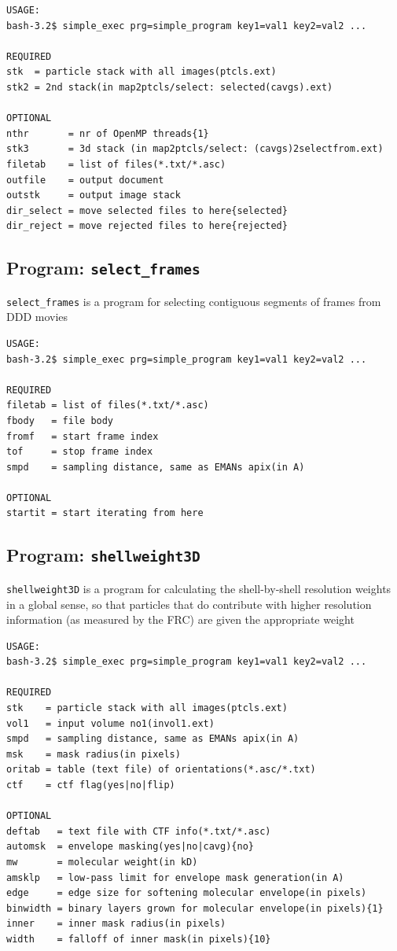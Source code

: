 \documentclass[a4paper,11pt]{article}
\newcommand{\prgname}[1]{\textcolor{NavyBlue}{\texttt{#1}}}
\begin{document}
\begin{verbatim}
USAGE:
bash-3.2$ simple_exec prg=simple_program key1=val1 key2=val2 ...

REQUIRED
stk  = particle stack with all images(ptcls.ext)
stk2 = 2nd stack(in map2ptcls/select: selected(cavgs).ext)

OPTIONAL
nthr       = nr of OpenMP threads{1}
stk3       = 3d stack (in map2ptcls/select: (cavgs)2selectfrom.ext)
filetab    = list of files(*.txt/*.asc)
outfile    = output document
outstk     = output image stack
dir_select = move selected files to here{selected}
dir_reject = move rejected files to here{rejected}
\end{verbatim}

\subsection{Program: \prgname{select\_frames}}
\label{select_frames}
\prgname{select\_frames} is a program for selecting contiguous segments of frames from DDD movies 

\begin{verbatim}
USAGE:
bash-3.2$ simple_exec prg=simple_program key1=val1 key2=val2 ...

REQUIRED
filetab = list of files(*.txt/*.asc)
fbody   = file body
fromf   = start frame index
tof     = stop frame index
smpd    = sampling distance, same as EMANs apix(in A)

OPTIONAL
startit = start iterating from here
\end{verbatim}

\subsection{Program: \prgname{shellweight3D}}
\label{shellweight3D}
\prgname{shellweight3D} is a program for calculating the shell-by-shell resolution weights in a global sense, so that particles that do contribute with higher resolution information (as measured by the FRC) are given the appropriate weight

\begin{verbatim}
USAGE:
bash-3.2$ simple_exec prg=simple_program key1=val1 key2=val2 ...

REQUIRED
stk    = particle stack with all images(ptcls.ext)
vol1   = input volume no1(invol1.ext)
smpd   = sampling distance, same as EMANs apix(in A)
msk    = mask radius(in pixels)
oritab = table (text file) of orientations(*.asc/*.txt)
ctf    = ctf flag(yes|no|flip)

OPTIONAL
deftab   = text file with CTF info(*.txt/*.asc)
automsk  = envelope masking(yes|no|cavg){no}
mw       = molecular weight(in kD)
amsklp   = low-pass limit for envelope mask generation(in A)
edge     = edge size for softening molecular envelope(in pixels)
binwidth = binary layers grown for molecular envelope(in pixels){1}
inner    = inner mask radius(in pixels)
width    = falloff of inner mask(in pixels){10}
\end{verbatim}
\end{document}
